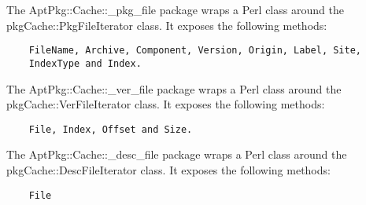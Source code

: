 \documentclass[]{article}
\begin{document}

The AptPkg::Cache::\_pkg\_file package wraps a Perl class around the
pkgCache::PkgFileIterator class. It exposes the following methods:

\begin{verbatim}
    FileName, Archive, Component, Version, Origin, Label, Site,
    IndexType and Index.
\end{verbatim}


The AptPkg::Cache::\_ver\_file package wraps a Perl class around the
pkgCache::VerFileIterator class. It exposes the following methods:

\begin{verbatim}
    File, Index, Offset and Size.
\end{verbatim}


The AptPkg::Cache::\_desc\_file package wraps a Perl class around the
pkgCache::DescFileIterator class. It exposes the following methods:

\begin{verbatim}
    File
\end{verbatim}

\end{document}
